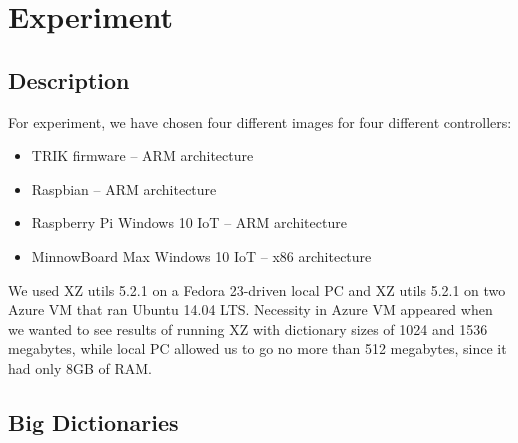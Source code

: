 \documentclass[conference]{IEEEtran}
\begin{document}
\section{Experiment}
\label{sec:experiment}

\subsection{Description}

For experiment, we have chosen four different images for four different controllers:
\begin{itemize}
\item TRIK firmware -- ARM architecture
\item Raspbian      -- ARM architecture
\item Raspberry Pi Windows 10 IoT -- ARM architecture
\item MinnowBoard Max Windows 10 IoT -- x86 architecture
\end{itemize}

We used XZ utils 5.2.1 on a Fedora 23-driven local PC and XZ utils 5.2.1 on two Azure VM that ran Ubuntu 14.04 LTS. Necessity in Azure VM appeared when we wanted to see results of running XZ with dictionary sizes of 1024 and 1536 megabytes, while local PC allowed us to go no more than 512 megabytes, since it had only 8GB of RAM.


\subsection{Big Dictionaries}

%
%
\end{document}
